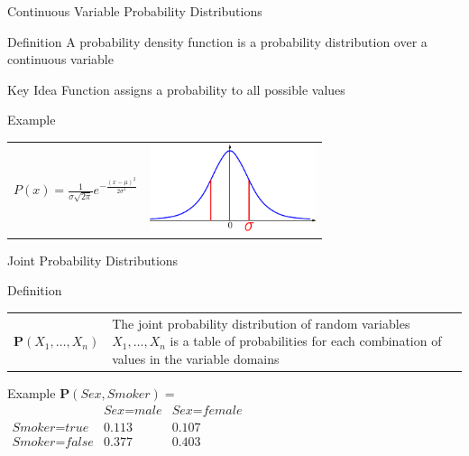 \documentclass[14pt]{beamer}
\begin{document}
\begin{frame}{Continuous Variable Probability Distributions}
	\begin{block}{Definition}
		A \alert{probability density function} is a probability distribution over a continuous variable
	\end{block}
	\begin{block}{Key Idea}
		Function assigns a probability to all possible values
	\end{block}
	\pause
	\begin{block}{Example}
		\begin{tabular}{lr}
			\large $P(x) = \frac{1}{\sigma\sqrt{2\pi}}e^{-\frac{(x - \mu)^{2}}{2\sigma^{2}}}$ 
			&
			\parbox{2in}{\includegraphics[height=1in]{gaussian-density}}
		\end{tabular}
	\end{block}
\end{frame}
\begin{frame}{Joint Probability Distributions}
	\begin{block}{Definition}
		\begin{tabular}{@{}lm{2.85in}@{}}
			\large $\mathbf{P}(X_1, \ldots, X_n)$
			&
			The \alert{joint probability distribution} of random variables $X_1, \ldots, X_n$ is a table of probabilities for each combination of values in the variable domains
		\end{tabular}
	\end{block}
	\pause
	\begin{block}{Example}
		$\mathbf{P}(\textit{Sex},\textit{Smoker}) = \mbox{}$ \\[.25em]
		\tab
		$
		\begin{array}{lcc}
			                           & \textit{Sex}\!=\!\textit{male} & \textit{Sex}\!=\!\textit{female} \\
			\textit{Smoker}\!=\!\textit{true}  & 0.113                  & 0.107 \\
			\textit{Smoker}\!=\!\textit{false} & 0.377                  & 0.403 \\
		\end{array}
		$
	\end{block}
\end{frame}
\end{document}
